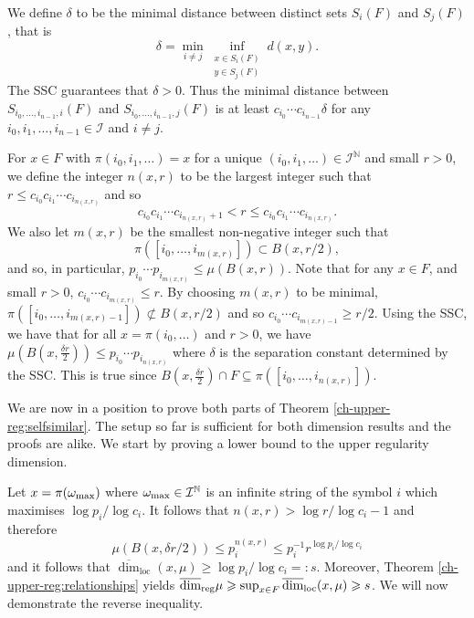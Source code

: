 We define $\delta$ to be the minimal distance between distinct  sets $S_i(F)$ and $S_j(F)$, that is 
\[
\delta= \min_{i\neq j} \inf_{\substack{x \in S_i(F) \\ y \in S_j(F)}} d(x,y).
\]
The SSC guarantees that $\delta > 0$. Thus the minimal distance between $S_{i_0,\ldots,i_{n-1},i}(F)$ and $S_{i_0,\ldots,i_{n-1},j}(F)$ is at least $c_{i_0}\cdots c_{i_{n-1}} \delta$ for any   $ i_0,i_1,\ldots, i_{n-1} \in \mathcal{I}$ and $i\neq j$.


For $x\in F$ with $\pi(i_0, i_1, \dots)=x$ for a unique $(i_0,i_1,\dots) \in \mathcal{I}^\mathbb{N}$ and small $r>0$, we define the integer $n(x,r)$ to be the largest integer such that $r \le c_{i_0}c_{i_1} \cdots c_{i_{n(x,r)}}$ and so
\[
c_{i_0}c_{i_1} \cdots c_{i_{n(x,r)}+1} < r \le c_{i_0}c_{i_1} \cdots c_{i_{n(x,r)}}.
\]
We also let $m(x,r)$ be the smallest non-negative  integer such that 
$$
\pi([i_0,\ldots, i_{m(x,r)}])\subset B(x,r/2),
$$
and so, in particular,  $p_{i_0}\cdots p_{i_{m(x,r)}} \le \mu (B(x,r))$.  Note that for any $x \in F$, and small $ r>0$,  $c_{i_0} \cdots c_{i_{m(x,r)}} \leq r$. By choosing $m(x,r)$ to be minimal,  $\pi([i_0,\ldots, i_{m(x,r)-1}]) \not\subset B(x,r/2)$ and so $c_{i_0} \cdots c_{i_{m(x,r)-1}} \ge r/2$. Using the SSC, we have that for all $x=\pi(i_0,\ldots)$ and  $r>0$, we have $\mu(B(x,\frac{\delta r}{2}))\le p_{i_0}\cdots p_{i_{n(x,r)}}$ where $\delta$ is the separation constant determined by the SSC. This is true since $B(x, \frac{\delta r}{2}) \cap F  \subseteq \pi([i_0,\ldots, i_{n(x,r)}])$.

We are now in a position to prove both parts of Theorem \ref{ch-upper-reg:selfsimilar}. The setup so far is sufficient for both dimension results and the proofs are alike. We start by proving a lower bound to the upper regularity dimension.

Let $x = \pi(\omega_\textup{max})$ where $\omega_\textup{max} \in \mathcal{I}^{\mathbb{N}}$ is an infinite string of the symbol  $i$ which maximises $\log p_i/\log c_i$. It follows that $n(x,r) > \log r / \log {c_i} - 1$ and therefore
\[
\mu(B(x,\delta r/2)) \le p_{i}^{n(x,r)} \leq p_i^{-1} r^{\log p_i/\log c_i}
\]
and it follows that $\overline{\dim}_{\text{loc}}(x,\mu) \geq \log p_i/\log c_i = \colon s$.  Moreover, Theorem \ref{ch-upper-reg:relationships} yields  $ \overline{\dim}_{\textup{reg}} \mu  \geqslant \sup_{x\in F} \overline{\dim}_{\text{loc}}(x,\mu) \geqslant  s$.  We will now demonstrate the reverse inequality. 





